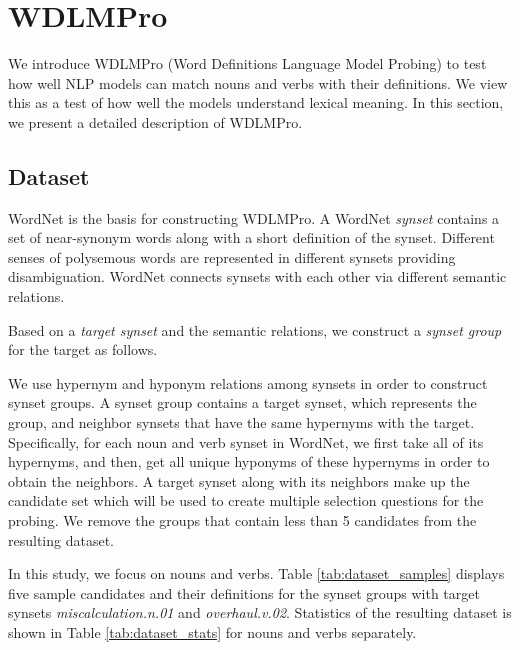 \documentclass[11pt,a4paper]{article}
\begin{document}
\section{WDLMPro}
We introduce  WDLMPro (Word Definitions Language Model
Probing) to test how well NLP models can match
nouns and verbs with  their
definitions.
We view this as a test of how well the models understand lexical meaning.
In this section, we
present a detailed description of WDLMPro.

\subsection{Dataset}
WordNet \cite{miller95wordnet} is the basis for
constructing WDLMPro.  A WordNet \textit{synset} contains a
set of near-synonym words along with a short definition of
the synset.  Different senses of polysemous words are
represented in different synsets providing
disambiguation. WordNet connects synsets with each other via
different semantic relations.

Based on a \emph{target synset} and the semantic relations, we construct
a \emph{synset group} for the target as follows.



 We use hypernym
and hyponym relations among synsets in order to construct
synset groups. A synset group contains a target synset,
which represents the group, and neighbor synsets that have
the same hypernyms with the target. Specifically, for each
noun and verb synset in WordNet, we first take all of its
hypernyms, and then, get all unique hyponyms of these
hypernyms in order to obtain the neighbors.  A target synset
along with its neighbors make up the candidate set which
will be used to create multiple selection questions for the
probing. We remove the groups that contain less than 5
candidates from the resulting dataset.


In this study, we focus on nouns and verbs.
Table
\ref{tab:dataset_samples} displays five sample candidates
and their definitions for the synset groups with target
synsets \emph{miscalculation.n.01} and
\emph{overhaul.v.02}. Statistics of the resulting dataset is
shown in Table \ref{tab:dataset_stats} for nouns and verbs
separately.
\end{document}
